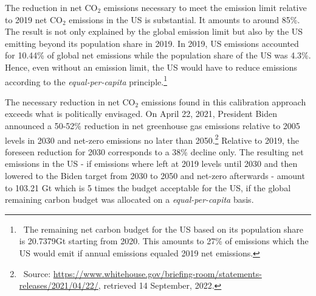  The reduction in net CO$_2$ emissions necessary to meet the emission limit relative to 2019 net CO$_2$ emissions in the US  is substantial. It amounts to around 85\%. The result is not only explained by the global emission limit but also by the US emitting beyond its population share in 2019. In 2019, US emissions accounted for 10.44\% of global net emissions while the population share of the US was 4.3\%. Hence, even without an emission limit, the US would have to reduce emissions according to the \textit{equal-per-capita} principle.\footnote{\ The remaining net carbon budget for the US based on its population share is 20.7379Gt starting from 2020. This amounts to 27\% of emissions which the US would emit if annual emissions equaled 2019 net emissions.} 
 
 The necessary reduction in net CO$_2$ emissions found in this calibration approach exceeds what is politically envisaged. On April 22, 2021, President Biden announced a 50-52\% reduction in net greenhouse gas emissions relative to 2005 levels in 2030 %
 and net-zero emissions no later than 2050.\footnote{\ Source: \href{https://www.whitehouse.gov/briefing-room/statements-releases/2021/04/22/fact-sheet-president-biden-sets-2030-greenhouse-gas-pollution-reduction-target-aimed-at-creating-good-paying-union-jobs-and-securing-u-s-leadership-on-clean-energy-technologies/}{https://www.whitehouse.gov/briefing-room/statements-releases/2021/04/22/}, retrieved 14 September, 2022.} 
 Relative to 2019, the foreseen reduction for 2030 corresponds to a 38\% decline only.
  The resulting net emissions in the US - if emissions where left at 2019 levels until 2030 and then lowered to the Biden target from 2030 to 2050 and net-zero afterwards - amount to 103.21 Gt which is 5 times the budget acceptable for the US,  if the global remaining carbon budget was allocated on a \textit{equal-per-capita} basis. 

 




